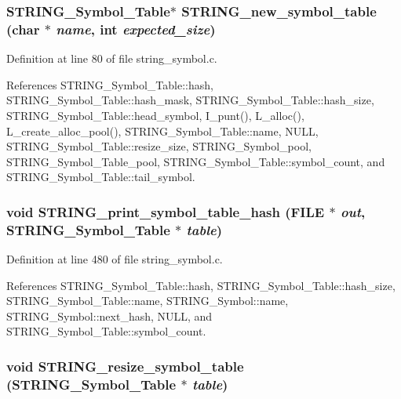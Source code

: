 \subsubsection{\setlength{\rightskip}{0pt plus 5cm}\bf{STRING\_\-Symbol\_\-Table}$\ast$ STRING\_\-new\_\-symbol\_\-table (char $\ast$ {\em name}, int {\em expected\_\-size})}\label{string__symbol_8c_28305366471c84770b5d9e0a2de17974}




Definition at line 80 of file string\_\-symbol.c.

References STRING\_\-Symbol\_\-Table::hash, STRING\_\-Symbol\_\-Table::hash\_\-mask, STRING\_\-Symbol\_\-Table::hash\_\-size, STRING\_\-Symbol\_\-Table::head\_\-symbol, I\_\-punt(), L\_\-alloc(), L\_\-create\_\-alloc\_\-pool(), STRING\_\-Symbol\_\-Table::name, NULL, STRING\_\-Symbol\_\-Table::resize\_\-size, STRING\_\-Symbol\_\-pool, STRING\_\-Symbol\_\-Table\_\-pool, STRING\_\-Symbol\_\-Table::symbol\_\-count, and STRING\_\-Symbol\_\-Table::tail\_\-symbol.
\subsubsection{\setlength{\rightskip}{0pt plus 5cm}void STRING\_\-print\_\-symbol\_\-table\_\-hash (FILE $\ast$ {\em out}, \bf{STRING\_\-Symbol\_\-Table} $\ast$ {\em table})}\label{string__symbol_8c_e22aa760f6c87bdf0b00b5df83b11961}




Definition at line 480 of file string\_\-symbol.c.

References STRING\_\-Symbol\_\-Table::hash, STRING\_\-Symbol\_\-Table::hash\_\-size, STRING\_\-Symbol\_\-Table::name, STRING\_\-Symbol::name, STRING\_\-Symbol::next\_\-hash, NULL, and STRING\_\-Symbol\_\-Table::symbol\_\-count.
\subsubsection{\setlength{\rightskip}{0pt plus 5cm}void STRING\_\-resize\_\-symbol\_\-table (\bf{STRING\_\-Symbol\_\-Table} $\ast$ {\em table})}\label{string__symbol_8c_ef1b60f1b9832949f447ddab1c122b45}




